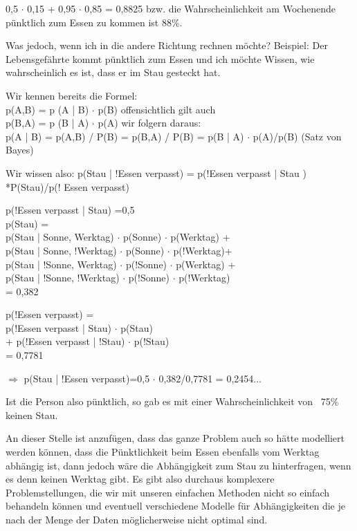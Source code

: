 0,5 $\cdot$ 0,15 + 0,95 $\cdot$ 0,85 = 0,8825 bzw. die Wahrscheinlichkeit am Wochenende pünktlich zum Essen zu kommen ist 88\%.

Was jedoch, wenn ich in die andere Richtung rechnen möchte?
Beispiel: Der Lebensgefährte kommt pünktlich zum Essen und ich möchte Wissen, wie wahrscheinlich es ist, dass er im Stau gesteckt hat.

Wir kennen bereits die Formel:\\
p(A,B) = p (A | B) $\cdot$ p(B) offensichtlich gilt auch\\
p(B,A) = p (B | A) $\cdot$ p(A) wir folgern daraus:\\
p(A | B) = p(A,B) / P(B) = p(B,A) / P(B) = p(B | A) $\cdot$ p(A)/p(B) (Satz von Bayes)

Wir wissen also:
p(Stau | !Essen verpasst) = p(!Essen verpasst | Stau ) *P(Stau)/p(! Essen verpasst)

p(!Essen verpasst | Stau) =0,5\\
p(Stau) =\\
p(Stau | Sonne, Werktag) $\cdot$ p(Sonne) $\cdot$ p(Werktag) + \\ p(Stau | Sonne, !Werktag) $\cdot$ p(Sonne) $\cdot$ p(!Werktag)+ \\ p(Stau | !Sonne, Werktag) $\cdot$ p(!Sonne) $\cdot$ p(Werktag) + \\ p(Stau | !Sonne, !Werktag) $\cdot$ p(!Sonne) $\cdot$ p(!Werktag)\\ = 0,382

p(!Essen verpasst) =\\
p(!Essen verpasst | Stau) $\cdot$ p(Stau)\\ + p(!Essen verpasst | !Stau) $\cdot$ p(!Stau)\\ = 0,7781

$\Rightarrow$ p(Stau | !Essen verpasst)=0,5 $\cdot$ 0,382/0,7781 = 0,2454...

Ist die Person also pünktlich, so gab es mit einer Wahrscheinlichkeit von ~75\% keinen Stau.

An dieser Stelle ist anzufügen, dass das ganze Problem auch so hätte modelliert werden können, dass die Pünktlichkeit beim Essen ebenfalls vom Werktag abhängig ist, dann jedoch wäre die Abhängigkeit zum Stau zu hinterfragen, wenn es denn keinen Werktag gibt.
Es gibt also durchaus komplexere Problemstellungen, die wir mit unseren einfachen Methoden nicht so einfach behandeln können und eventuell verschiedene Modelle für Abhängigkeiten die je nach der Menge der Daten möglicherweise nicht optimal sind.

